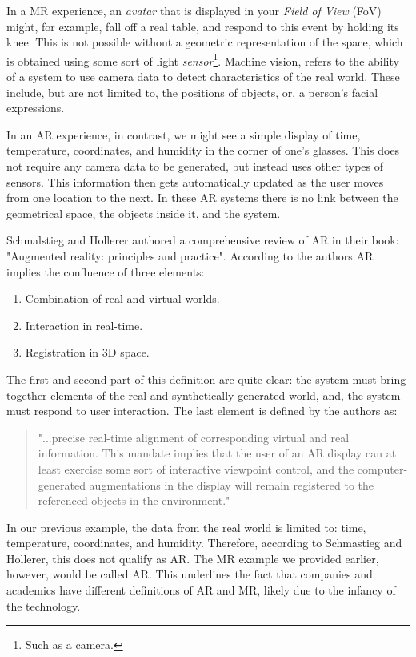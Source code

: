 In a MR experience, an \textit{avatar} that is displayed in your \textit{Field of View} (FoV) might, for example, fall off a real table, and respond to this event by holding its knee. This is not possible without a geometric representation of the space, which is obtained using some sort of light \textit{sensor}\footnote{Such as a camera.}. Machine vision, refers to the ability of a system to use camera data to detect characteristics of the real world. These include, but are not limited to, the positions of objects, or, a person's facial expressions.

In an AR experience, in contrast, we might see a simple display of time, temperature, coordinates, and humidity in the corner of one's glasses. This does not require any camera data to be generated, but instead uses other types of sensors. This information then gets automatically updated as the user moves from one location to the next. In these AR systems there is no link between the geometrical space, the objects inside it, and the system. 

Schmalstieg and Hollerer \cite{schmalstieg2016augmented} authored a comprehensive review of AR in their book: "Augmented reality: principles and practice". According to the authors AR implies the confluence of three elements:

\begin{enumerate}
    \item Combination of real and virtual worlds. 
    \item Interaction in real-time.
    \item Registration in 3D space. 
\end{enumerate}

The first and second part of this definition are quite clear: the system must bring together elements of the real and synthetically generated world, and, the system must respond to user interaction. The last element is defined by the authors as: 

\begin{quote}
    "...precise real-time alignment of corresponding virtual and real information. This mandate implies that the user of an AR display can at least exercise some sort of interactive viewpoint control, and the computer-generated augmentations in the display will remain registered to the referenced objects in the environment."
\end{quote}

In our previous example, the data from the real world is limited to: time, temperature, coordinates, and humidity. Therefore, according to Schmastieg and Hollerer, this does not qualify as AR. The MR example we provided earlier, however, would be called AR. This underlines the fact that companies and academics have different definitions of AR and MR, likely due to the infancy of the technology. 

